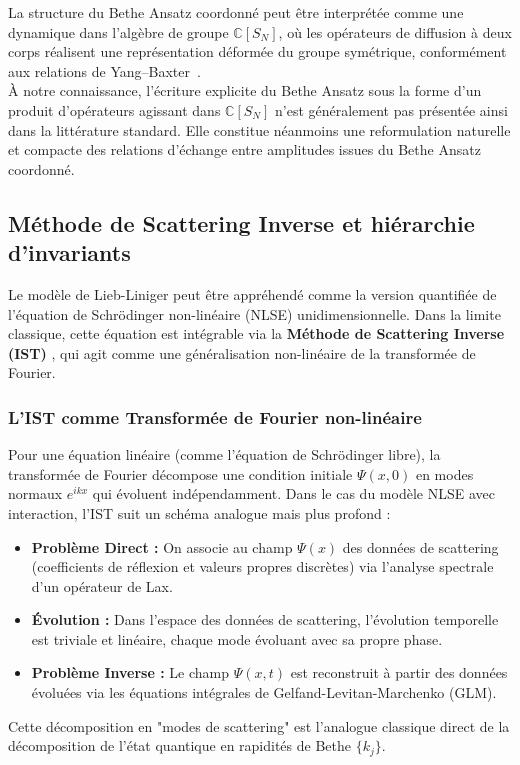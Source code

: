 \bigskip

La structure du Bethe Ansatz coordonné peut être interprétée comme une dynamique dans l’algèbre de groupe $\mathbb{C}[S_N]$, où les opérateurs de diffusion à deux corps réalisent une représentation déformée du groupe symétrique, conformément aux relations de Yang--Baxter~\cite{LL_1963_1,Takahashi1999,Franchini_2016,Yang1967, Polychronakos1999,Cherednik1987}.\\

À notre connaissance, l’écriture explicite du Bethe Ansatz sous la forme d’un produit d’opérateurs agissant dans $\mathbb{C}[S_N]$ n’est généralement pas présentée ainsi dans la littérature standard. Elle constitue néanmoins une reformulation naturelle et compacte des relations d’échange entre amplitudes issues du Bethe Ansatz coordonné.


\subsection{Méthode de Scattering Inverse et hiérarchie d'invariants}
Le modèle de Lieb-Liniger peut être appréhendé comme la version quantifiée de l'équation de Schrödinger non-linéaire (NLSE) unidimensionnelle. Dans la limite classique, cette équation est intégrable via la {\bf Méthode de Scattering Inverse (IST)} \cite{bezzaz2023rapiditydistributiondefocusingnonlinear,ZakharovShabat1972}, qui agit comme une généralisation non-linéaire de la transformée de Fourier.

\subsubsection{L'IST comme Transformée de Fourier non-linéaire}

Pour une équation linéaire (comme l'équation de Schrödinger libre), la transformée de Fourier décompose une condition initiale $\Psi(x, 0)$ en modes normaux $e^{ikx}$ qui évoluent indépendamment. Dans le cas du modèle NLSE avec interaction, l'IST suit un schéma analogue mais plus profond :
\begin{itemize}[label = $\bullet$]
    \item \textbf{Problème Direct :} On associe au champ $\Psi(x)$ des données de scattering (coefficients de réflexion et valeurs propres discrètes) via l'analyse spectrale d'un opérateur de Lax.
    \item \textbf{Évolution :} Dans l'espace des données de scattering, l'évolution temporelle est triviale et linéaire, chaque mode évoluant avec sa propre phase.
    \item \textbf{Problème Inverse :} Le champ $\Psi(x, t)$ est reconstruit à partir des données évoluées via les équations intégrales de Gelfand-Levitan-Marchenko (GLM).
\end{itemize}
Cette décomposition en "modes de scattering" est l'analogue classique direct de la décomposition de l'état quantique en rapidités de Bethe $\{k_j\}$.

